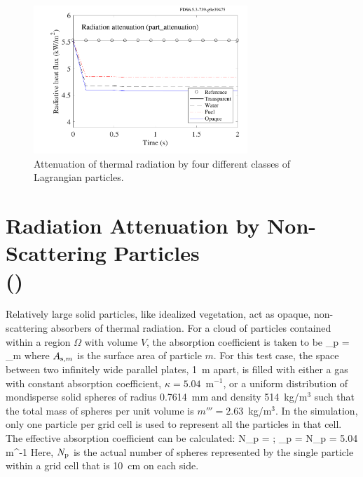 \documentclass[11pt]{book}
\begin{document}
\begin{figure}[h]
\centering
\includegraphics[height=2.2in]{SCRIPT_FIGURES/part_attenuation}
\caption[Radiation attenuation by Lagrangian particles]{Attenuation of thermal radiation by four different classes of Lagrangian particles.}
\label{part_attenuation_figure}
\end{figure}


\section{Radiation Attenuation by Non-Scattering Particles \\ (\texorpdfstring{}{radiation\_gas-veg\_consistency})}
\label{radiation_gas-veg_consistency}
\label{radiation_gas-veg_consistency_gas}
\label{radiation_gas-veg_consistency_veg}

Relatively large solid particles, like idealized vegetation, act as opaque, non-scattering absorbers of thermal radiation. For a cloud of particles contained within a region $\Omega$ with volume $V$, the absorption coefficient is taken to be
\be
   \kappa_{\rm p} = \sum_{m \in \Omega} 
\ee
where $A_{{\rm s},m}$ is the surface area of particle $m$. For this test case, the space between two infinitely wide parallel plates, 1~m apart, is filled with either a gas with constant absorption coefficient, $\kappa=5.04$~m$^{-1}$, or a uniform distribution of mondisperse solid spheres of radius 0.7614~mm and density 514~kg/m$^3$ such that the total mass of spheres per unit volume is $m'''=2.63$~kg/m$^3$. In the simulation, only one particle per grid cell is used to represent all the particles in that cell. The effective absorption coefficient can be calculated:
\be
   N_{\rm p} =  \quad ; \quad \kappa_{\rm p} = N_{\rm p}  = 5.04 \; \hbox{m}^{-1}
\ee
Here, $N_{\rm p}$ is the actual number of spheres represented by the single particle within a grid cell that is 10~cm on each side.
\end{document}
